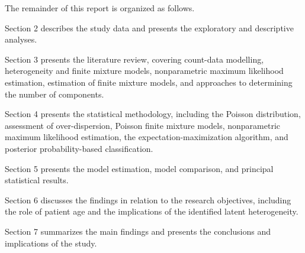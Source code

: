 The remainder of this report is organized as follows.

Section 2 describes the study data and presents the exploratory and descriptive
analyses.

Section 3 presents the literature review, covering count-data modelling,
heterogeneity and finite mixture models, nonparametric maximum likelihood
estimation, estimation of finite mixture models, and approaches to determining
the number of components.

Section 4 presents the statistical methodology, including the Poisson
distribution, assessment of over-dispersion, Poisson finite mixture models,
nonparametric maximum likelihood estimation, the expectation-maximization
algorithm, and posterior probability-based classification.

Section 5 presents the model estimation, model comparison, and principal
statistical results.

Section 6 discusses the findings in relation to the research objectives,
including the role of patient age and the implications of the identified
latent heterogeneity.

Section 7 summarizes the main findings and presents the conclusions and
implications of the study.